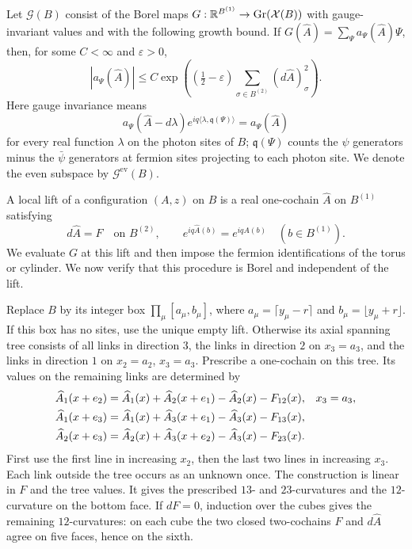 Let $\mathcal G(B)$ consist of the Borel maps
$G:\mathbb R^{B^{(1)}}\to\operatorname{Gr}(\mathcal X(B))$ with gauge-invariant
values and with the following growth bound. If
$G(\widehat A)=\sum_\Psi a_\Psi(\widehat A)\Psi$, then, for some
$C<\infty$ and $\varepsilon>0$,
\begin{equation}\label{eq:slab-box-growth}
 |a_\Psi(\widehat A)|\le C
   \exp\left((\tfrac12-\varepsilon)
                    \sum_{\sigma\in B^{(2)}}(d\widehat A)_\sigma^2\right).
\end{equation}
Here gauge invariance means
\begin{equation}\label{eq:slab-box-gauge}
 a_\Psi(\widehat A-d\lambda)
        e^{iq\langle\lambda,\mathfrak q(\Psi)\rangle}
       =a_\Psi(\widehat A)
\end{equation}
for every real function $\lambda$ on the photon sites of $B$;
$\mathfrak q(\Psi)$ counts the $\psi$ generators minus the
$\bar\psi$ generators at fermion sites projecting to each photon site.
We denote the even subspace by $\mathcal G^{\mathrm{ev}}(B)$.

A local lift of a configuration $(A,z)$ on $B$ is a real one-cochain
$\widehat A$ on $B^{(1)}$ satisfying
\begin{equation}\label{eq:slab-local-lift}
 d\widehat A=F\quad\text{on }B^{(2)},\qquad
 e^{iq\widehat A(b)}=e^{iqA(b)}\quad(b\in B^{(1)}).
\end{equation}
We evaluate $G$ at this lift and then impose the fermion identifications
of the torus or cylinder. We now verify that this procedure is Borel
and independent of the lift.

Replace $B$ by its integer box
$\prod_\mu[a_\mu,b_\mu]$, where $a_\mu=\lceil y_\mu-r\rceil$ and
$b_\mu=\lfloor y_\mu+r\rfloor$. If this box has no sites, use the
unique empty lift. Otherwise its axial spanning tree consists of all
links in direction $3$, the links in direction $2$ on $x_3=a_3$, and the
links in direction $1$ on $x_2=a_2$, $x_3=a_3$. Prescribe a one-cochain
on this tree. Its values on the remaining links are determined by
\begin{align}\label{eq:slab-lift-recursion}
 \widehat A_1(x+e_2)&=\widehat A_1(x)+\widehat A_2(x+e_1)
                                  -\widehat A_2(x)-F_{12}(x),
                                  &&x_3=a_3,\notag\\
 \widehat A_1(x+e_3)&=\widehat A_1(x)+\widehat A_3(x+e_1)
                                  -\widehat A_3(x)-F_{13}(x),\\
 \widehat A_2(x+e_3)&=\widehat A_2(x)+\widehat A_3(x+e_2)
                                  -\widehat A_3(x)-F_{23}(x).\notag
\end{align}
First use the first line in increasing $x_2$, then the last two lines
in increasing $x_3$. Each link outside the tree occurs as an unknown
once. The construction is linear in $F$ and the tree values. It gives
the prescribed $13$- and $23$-curvatures and the $12$-curvature on the
bottom face. If $dF=0$, induction over the cubes gives the remaining
$12$-curvatures: on each cube the two closed two-cochains $F$ and
$d\widehat A$ agree on five faces, hence on the sixth.


